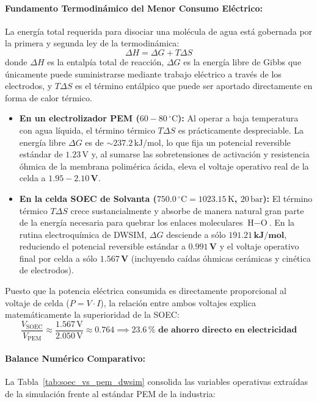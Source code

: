 \documentclass[11pt,a4paper]{article}
\begin{document}
\paragraph{Fundamento Termodinámico del Menor Consumo Eléctrico:}
La energía total requerida para disociar una molécula de agua está gobernada por la primera y segunda ley de la termodinámica:
\begin{equation}
    \Delta H = \Delta G + T\Delta S
\end{equation}
donde $\Delta H$ es la entalpía total de reacción, $\Delta G$ es la energía libre de Gibbs que únicamente puede suministrarse mediante trabajo eléctrico a través de los electrodos, y $T\Delta S$ es el término entálpico que puede ser aportado directamente en forma de calor térmico.
\begin{itemize}
    \item \textbf{En un electrolizador PEM ($60 - 80\,^\circ\text{C}$):} Al operar a baja temperatura con agua líquida, el término térmico $T\Delta S$ es prácticamente despreciable. La energía libre $\Delta G$ es de $\sim 237.2\,\text{kJ/mol}$, lo que fija un potencial reversible estándar de $1.23\,\text{V}$ y, al sumarse las sobretensiones de activación y resistencia óhmica de la membrana polimérica ácida, eleva el voltaje operativo real de la celda a $\mathbf{1.95 - 2.10\,\text{V}}$.
    \item \textbf{En la celda SOEC de Solvanta ($750.0\,^\circ\text{C} = 1023.15\,\text{K}$, $20\,\text{bar}$):} El término térmico $T\Delta S$ crece sustancialmente y absorbe de manera natural gran parte de la energía necesaria para quebrar los enlaces moleculares $\text{H}-\text{O}$. En la rutina electroquímica de DWSIM, $\Delta G$ desciende a sólo $\mathbf{191.21\,\text{kJ/mol}}$, reduciendo el potencial reversible estándar a $\mathbf{0.991\,\text{V}}$ y el voltaje operativo final por celda a sólo $\mathbf{1.567\,\text{V}}$ (incluyendo caídas óhmicas cerámicas y cinética de electrodos).
\end{itemize}
Puesto que la potencia eléctrica consumida es directamente proporcional al voltaje de celda ($P = V \cdot I$), la relación entre ambos voltajes explica matemáticamente la superioridad de la SOEC:
\begin{equation}
    \frac{V_{\text{SOEC}}}{V_{\text{PEM}}} \approx \frac{1.567\,\text{V}}{2.050\,\text{V}} \approx 0.764 \implies \mathbf{23.6\,\%\text{ de ahorro directo en electricidad}}
\end{equation}

\paragraph{Balance Numérico Comparativo:}
La Tabla~\ref{tab:soec_vs_pem_dwsim} consolida las variables operativas extraídas de la simulación frente al estándar PEM de la industria:
\end{document}
